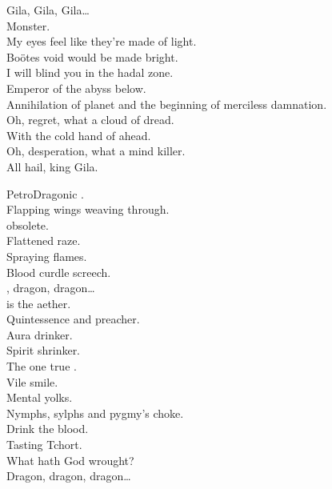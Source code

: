Gila, Gila, Gila… \\
Monster. \\

My eyes feel like they're made of light. \\
Boötes void would be made bright. \\
I will blind you in the hadal zone. \\
Emperor of the abyss below. \\

Annihilation of planet  and the beginning of merciless damnation. \\

Oh, regret, what a cloud of dread. \\
With the cold hand of  ahead. \\
Oh, desperation, what a mind killer. \\
All hail, king Gila. \\



PetroDragonic . \\

Flapping wings weaving through. \\
 obsolete. \\
Flattened raze. \\
Spraying flames. \\
Blood curdle screech. \\

, dragon, dragon… \\

 is the aether. \\
Quintessence and preacher. \\
Aura drinker. \\
Spirit shrinker. \\
The one true . \\
Vile smile. \\
Mental yolks. \\
Nymphs, sylphs and pygmy's choke. \\
Drink the blood. \\
Tasting Tchort. \\
What hath God wrought? \\

Dragon, dragon, dragon… \\

